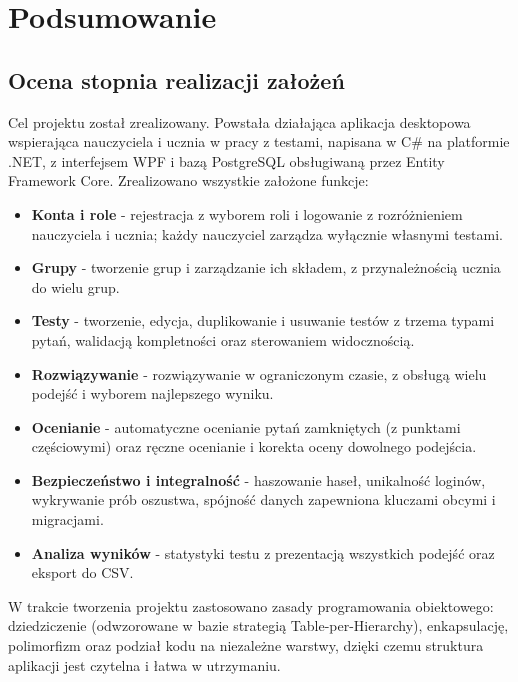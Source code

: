 ﻿\chapter{Podsumowanie}
\label{cha:podsumowanie}

\section{Ocena stopnia realizacji założeń}
\label{sec:ocenaRealizacji}

Cel projektu został zrealizowany. Powstała działająca aplikacja desktopowa wspierająca nauczyciela
i ucznia w pracy z testami, napisana w C\# na platformie .NET, z interfejsem WPF i bazą PostgreSQL
obsługiwaną przez Entity Framework Core. Zrealizowano wszystkie założone funkcje:

\begin{itemize}
  \item \textbf{Konta i role} - rejestracja z wyborem roli i logowanie z rozróżnieniem nauczyciela
        i ucznia; każdy nauczyciel zarządza wyłącznie własnymi testami.
  \item \textbf{Grupy} - tworzenie grup i zarządzanie ich składem, z przynależnością ucznia do wielu
        grup.
  \item \textbf{Testy} - tworzenie, edycja, duplikowanie i usuwanie testów z trzema typami pytań,
        walidacją kompletności oraz sterowaniem widocznością.
  \item \textbf{Rozwiązywanie} - rozwiązywanie w ograniczonym czasie, z obsługą wielu podejść
        i wyborem najlepszego wyniku.
  \item \textbf{Ocenianie} - automatyczne ocenianie pytań zamkniętych (z punktami częściowymi) oraz
        ręczne ocenianie i korekta oceny dowolnego podejścia.
  \item \textbf{Bezpieczeństwo i integralność} - haszowanie haseł, unikalność loginów, wykrywanie prób
        oszustwa, spójność danych zapewniona kluczami obcymi i migracjami.
  \item \textbf{Analiza wyników} - statystyki testu z prezentacją wszystkich podejść oraz eksport do CSV.
\end{itemize}

W trakcie tworzenia projektu zastosowano zasady programowania obiektowego: dziedziczenie (odwzorowane
w bazie strategią Table-per-Hierarchy), enkapsulację, polimorfizm oraz podział kodu na niezależne
warstwy, dzięki czemu struktura aplikacji jest czytelna i łatwa w utrzymaniu.

